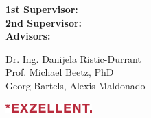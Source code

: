 \begin{titlepage}
\vfill

\begin{minipage}{0.2\linewidth}
\begin{flushleft}
\small \textbf{1st Supervisor:} \\
\small \textbf{2nd Supervisor:} \\
\small \textbf{Advisors:} \\
\end{flushleft}
\end{minipage}
\hfill
\begin{minipage}{0.7\linewidth}
\begin{flushleft}
\small Dr. Ing. Danijela Ristic-Durrant \\
\small Prof. Michael Beetz, PhD \\
\small  Georg Bartels, Alexis Maldonado\\
\end{flushleft}
\end{minipage}

\vspace{1.2cm}

\begin{flushleft}
\includegraphics[width=0.25\textwidth]{bilder/EXZELLENT_logo.png}
\end{flushleft}

\vspace{1cm}

\newpage

\end{titlepage}

